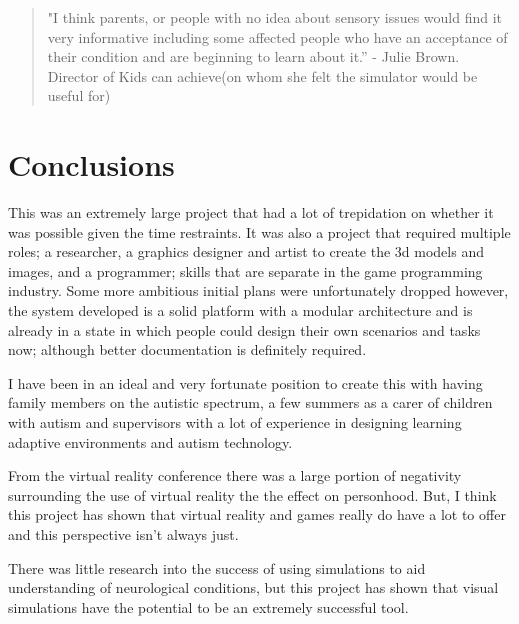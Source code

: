 \begin{quote}
"I think parents, or people with no idea about sensory issues would find it very informative including some affected people who have an acceptance of their condition and are beginning to learn about it.” - Julie Brown. Director of Kids can achieve(on whom she felt the simulator would be useful for) 
\end{quote}

\section{Conclusions}
This was an extremely large project that had a lot of trepidation on whether it was possible given the time restraints. It was also a project that required multiple roles; a researcher, a graphics designer and artist to create the 3d models and images, and a programmer; skills that are separate in the game programming industry. Some more ambitious initial plans were unfortunately dropped however, the system developed is a solid platform with a modular architecture and is already in a state in which people could design their own scenarios and tasks now; although better documentation is definitely required. 

I have been in an ideal and very fortunate position to create this with having family members on the autistic spectrum, a few summers as a carer of children with autism and supervisors with a lot of experience in designing learning adaptive environments and autism technology.

From the virtual reality conference there was a large portion of negativity surrounding the use of virtual reality the the effect on personhood. But, I think this project has shown that virtual reality and games really do have a lot to offer and this perspective isn't always just.

There was little research into the success of using simulations to aid understanding of neurological conditions, but this project has shown that visual simulations have the potential to be an extremely successful tool.






